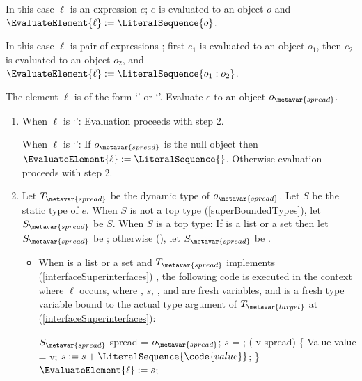 \documentclass[makeidx]{article}
\begin{document}
{\LMHash{}%
In this case $\ell$ is an expression $e$;
$e$ is evaluated to an object $o$
and $\EvaluateElement{\ell} := \LiteralSequence{o}$.
\EndCase

\LMHash{}%
In this case $\ell$ is pair of expressions
;
first $e_1$ is evaluated to an object $o_1$,
then $e_2$ is evaluated to an object $o_2$,
and $\EvaluateElement{\ell} := \LiteralSequence{o_1:o_2}$.
\EndCase

\LMHash{}%
The element $\ell$ is of the form `' or `'.
Evaluate $e$ to an object $o_{\metavar{spread}}$.
\begin{enumerate}
\item
  When $\ell$ is `': Evaluation proceeds with step 2.

  When $\ell$ is `':
  If $o_{\metavar{spread}}$ is the null object then
  $\EvaluateElement{\ell} := \LiteralSequence{}$.
  Otherwise evaluation proceeds with step 2.
\item
  Let $T_{\metavar{spread}}$ be the dynamic type of $o_{\metavar{spread}}$.
  Let $S$ be the static type of $e$.
  When $S$ is not a top type
  (\ref{superBoundedTypes}),
  let $S_{\metavar{spread}}$ be $S$.
  When $S$ is a top type:
  If  is a list or a set then
  let $S_{\metavar{spread}}$ be ;
  otherwise
  (),
  let $S_{\metavar{spread}}$ be .

  \begin{itemize}
  \item
    When  is a list or a set
    and $T_{\metavar{spread}}$ implements
    (\ref{interfaceSuperinterfaces})
    ,
    the following code is executed in the context where $\ell$ occurs,
    where , $s$, , and  are fresh variables,
    and  is a fresh type variable bound to the
    actual type argument of $T_{\metavar{target}}$ at 
    (\ref{interfaceSuperinterfaces}):

    \vspace{-2ex}\begin{minipage}[t]{\textwidth}
\begin{normativeDartCode}
$S_{\metavar{spread}}$ spread = $o_{\metavar{spread}}$;
\VAR{} $s$ = \LiteralSequence;
\FOR{} (\VAR{} v \IN{} spread) \{
  Value value = v;
  $s := s + \LiteralSequence{\code{value}}$;
\}
$\EvaluateElement{\ell} := s$;
\end{normativeDartCode}
    \end{minipage}


\end{itemize}
\end{enumerate}}
\end{document}
